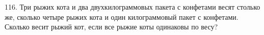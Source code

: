 116. Три рыжих кота и два двухкилограммовых пакета с конфетами весят столько же, сколько четыре рыжих кота и один килограммовый пакет с конфетами. Сколько весит рыжий кот, если все рыжие коты одинаковы по весу?\\
